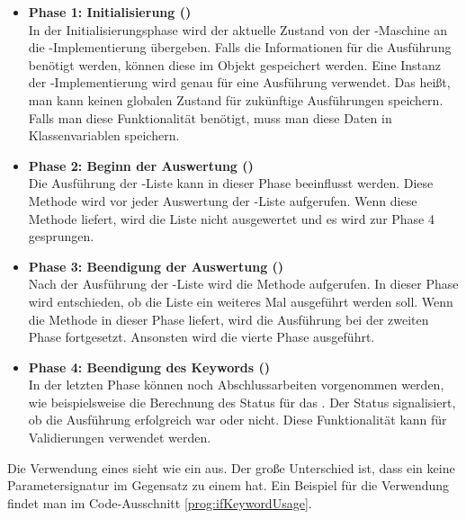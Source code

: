 \begin{itemize}

\item \textbf{Phase 1: Initialisierung ()}\\
In der Initialisierungsphase wird der aktuelle Zustand von der -Maschine an die -Implementierung übergeben. Falls die Informationen für die Ausführung benötigt werden, können diese im Objekt gespeichert werden. Eine Instanz der -Implementierung wird genau für eine Ausführung verwendet. Das heißt, man kann keinen globalen Zustand für zukünftige Ausführungen speichern. Falls man diese Funktionalität benötigt, muss man diese Daten in Klassenvariablen speichern.\\

\item \textbf{Phase 2: Beginn der Auswertung ()}\\
Die Ausführung der -Liste kann in dieser Phase beeinflusst werden. Diese Methode wird vor jeder Auswertung der -Liste aufgerufen. Wenn diese Methode  liefert, wird die Liste nicht ausgewertet und es wird zur Phase 4 gesprungen.\\

\item \textbf{Phase 3: Beendigung der Auswertung ()}\\
Nach der Ausführung der -Liste wird die Methode  aufgerufen. In dieser Phase wird entschieden, ob die Liste ein weiteres Mal ausgeführt werden soll. Wenn die Methode in dieser Phase  liefert, wird die Ausführung bei der zweiten Phase fortgesetzt. Ansonsten wird die vierte Phase ausgeführt.\\

\item \textbf{Phase 4: Beendigung des Keywords ()}\\
In der letzten Phase können noch Abschlussarbeiten vorgenommen werden, wie beispielsweise die Berechnung des Status für das . Der Status signalisiert, ob die Ausführung erfolgreich war oder nicht. Diese Funktionalität kann für Validierungen verwendet werden.

\end{itemize}

\SuperPar
Die Verwendung eines  sieht wie ein  aus. Der große Unterschied ist, dass ein  keine Parametersignatur im Gegensatz zu einem  hat. Ein Beispiel für die Verwendung findet man im Code-Ausschnitt \ref{prog:ifKeywordUsage}.

